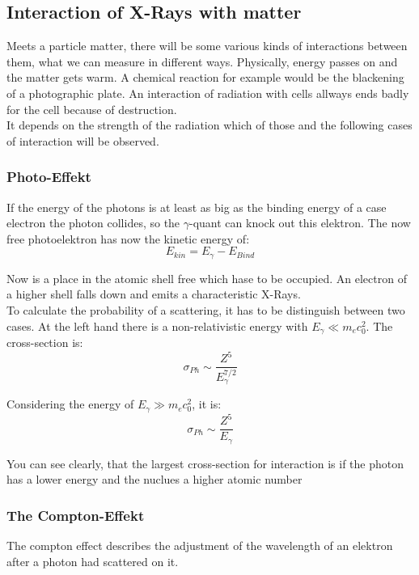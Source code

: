 \subsection{Interaction of X-Rays with matter}

Meets a particle matter, there will be some various kinds of interactions between them, what we can measure in different ways. Physically, energy passes on and the matter gets warm. A chemical reaction for example would be the blackening of a photographic plate. An interaction of radiation with cells allways ends badly for the cell because of destruction.\\
It depends on the strength of the radiation which of those and the following cases of interaction will be observed.

\subsubsection*{Photo-Effekt}

If the energy of the photons is at least as big as the binding energy of a case electron the photon collides, so the $\gamma$-quant can knock out this elektron. The now free photoelektron has now the kinetic energy of:
	\begin{equation}
	E_{kin} = E_{\gamma}-E_{Bind}
	\end{equation}


Now is a place in the atomic shell free which hase to be occupied. An electron of a higher shell falls down and emits a characteristic X-Rays.\\
To calculate the probability of a scattering, it has to be distinguish between two cases. At the left hand there is a non-relativistic energy with $E_{\gamma}\ll m_{e}c_{0}^{2}$. The cross-section is:
	\begin{equation}
	\sigma_{Ph} \sim \frac{Z^{5}}{E_{\gamma}^{7/2}}
	\end{equation}
	
Considering the energy of $E_{\gamma} \gg m_{e}c_{0}^{2}$, it is:
	\begin{equation}
	\sigma_{Ph} \sim \frac{Z^{5}}{E_{\gamma}}
	\end{equation}
	
You can see clearly, that the largest cross-section for interaction is if the photon has a lower energy and the nuclues a higher atomic number

\subsubsection*{The Compton-Effekt}
The compton effect describes the adjustment of the wavelength of an elektron after a photon had scattered on it.

